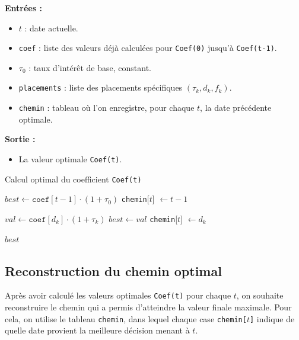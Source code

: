 \documentclass[a4paper,11pt]{article}
\begin{document}
    \vspace{0.3cm}

    \noindent \textbf{Entrées :}
    \begin{itemize}
        \item $t$ : date actuelle.
        \item \texttt{coef} : liste des valeurs déjà calculées pour \texttt{Coef(0)} jusqu’à \texttt{Coef(t-1)}.
        \item $\tau_0$ : taux d’intérêt de base, constant.
        \item \texttt{placements} : liste des placements spécifiques $(\tau_k, d_k, f_k)$.
        \item \texttt{chemin} : tableau où l’on enregistre, pour chaque $t$, la date précédente optimale.
    \end{itemize}

    \noindent \textbf{Sortie :}
    \begin{itemize}
        \item La valeur optimale \texttt{Coef(t)}.
    \end{itemize}

    \begin{algorithm}[H]
\caption{Calcul optimal du coefficient \texttt{Coef(t)}}
\begin{algorithmic}[1]
    \State $best \gets \texttt{coef}[t-1] \cdot (1 + \tau_0)$ 
    \State \texttt{chemin}[$t$] $\gets t - 1$ 

         
            \State $val \gets \texttt{coef}[d_k] \cdot (1 + \tau_k)$
                \State $best \gets val$
                \State \texttt{chemin}[$t$] $\gets d_k$ 
            \EndIf
        \EndIf
    \EndFor

    \State \Return $best$
\EndFunction
\end{algorithmic}
\end{algorithm}


\subsection{Reconstruction du chemin optimal}

Après avoir calculé les valeurs optimales \texttt{Coef(t)} pour chaque $t$, on souhaite reconstruire le chemin qui a permis d’atteindre la valeur finale maximale.  
Pour cela, on utilise le tableau \texttt{chemin}, dans lequel chaque case \texttt{chemin[$t$]} indique de quelle date provient la meilleure décision menant à $t$.
\end{document}
